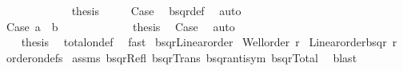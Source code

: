\begin{isabellebody}
\ \ \ \ \ \ \ \ \ \ \ \isamarkupfalse%
\ {\isacharquery}{\kern0pt}thesis\ \isamarkupfalse%
\ {}\ {}\ {}\ Case{}{}{}\ \isamarkupfalse%
\ bsqr{\isacharunderscore}{\kern0pt}def\ \isamarkupfalse%
\ auto\isanewline
\ \ \ \ \ \ \ \ \ \isamarkupfalse%
\isanewline
\ \ \ \ \ \ \ \ \ \ \ \isamarkupfalse%
\ Case{}{}{}{}{\isacharcolon}{\kern0pt}\ {\isachardoublequoteopen}a{}\ {\isacharequal}{\kern0pt}\ b{}{\isachardoublequoteclose}\isanewline
\ \ \ \ \ \ \ \ \ \ \ \isamarkupfalse%
\ {\isacharquery}{\kern0pt}thesis\ \isamarkupfalse%
\ Case{}{}{}\ \isamarkupfalse%
\ auto\isanewline
\ \ \ \ \ \ \ \ \ \isamarkupfalse%
\isanewline
\ \ \ \ \ \ \ \isamarkupfalse%
\isanewline
\ \ \ \ \ \isamarkupfalse%
\isanewline
\ \ \ \isamarkupfalse%
\isanewline
\ \ \isacommand{{\isacharbraceright}{\kern0pt}}\isamarkupfalse%
\isanewline
\ \ \isamarkupfalse%
\ {\isacharquery}{\kern0pt}thesis\ \isamarkupfalse%
\ total{\isacharunderscore}{\kern0pt}on{\isacharunderscore}{\kern0pt}def\ \isamarkupfalse%
\ fast\isanewline
{}\isamarkupfalse%
%
\endisatagproof
{\isafoldproof}%
%
\isadelimproof
\isanewline
%
\endisadelimproof
\isanewline
{}\isamarkupfalse%
\ bsqr{\isacharunderscore}{\kern0pt}Linear{\isacharunderscore}{\kern0pt}order{\isacharcolon}{\kern0pt}\isanewline
{}\ {\isachardoublequoteopen}Well{\isacharunderscore}{\kern0pt}order\ r{\isachardoublequoteclose}\isanewline
{}\ {\isachardoublequoteopen}Linear{\isacharunderscore}{\kern0pt}order{\isacharparenleft}{\kern0pt}bsqr\ r{\isacharparenright}{\kern0pt}{\isachardoublequoteclose}\isanewline
%
\isadelimproof
%
\endisadelimproof
%
\isatagproof
{}\isamarkupfalse%
\ order{\isacharunderscore}{\kern0pt}on{\isacharunderscore}{\kern0pt}defs\isanewline
{}\isamarkupfalse%
\ assms\ bsqr{\isacharunderscore}{\kern0pt}Refl\ bsqr{\isacharunderscore}{\kern0pt}Trans\ bsqr{\isacharunderscore}{\kern0pt}antisym\ bsqr{\isacharunderscore}{\kern0pt}Total\ \isamarkupfalse%
\ blast%
\endisatagproof
{\isafoldproof}%
%
\isadelimproof
\isanewline
%
\endisadelimproof
\isanewline
{}\isamarkupfalse%

\end{isabellebody}
